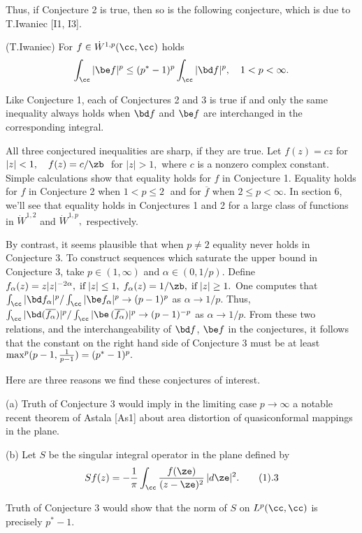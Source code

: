 Thus, if Conjecture 2 is true, then so is the following conjecture, which is 
due to T.Iwaniec [I1, I3]. 

 (T.Iwaniec) For $f\in \dot W^{1,p}(\cc, \cc)$ holds
$$\icc |\be f|^p \leq  (p^* - 1)^p \icc|\bd f|^p, \quad 1<p<\infty.$$ \endproclaim

Like Conjecture 1, each of Conjectures 2 and 3 is true if and only the same 
inequality always holds when $\bd f$ and $\be f$ are interchanged in the 
corresponding integral. 

All three conjectured inequalities are sharp, if they are true. Let $f(z) = 
cz$ for $|z|<1,\quad f(z) = c/\zb\;$ for $|z|>1,$ where $c$ is a nonzero 
complex constant. Simple calculations show that 
equality holds for $f$ in Conjecture 1. Equality holds for $f$ in Conjecture 2 
when $1< p \leq 2\;$ and for $\overline {f}$ when $2\leq p <\infty.$  
In section 6, we'll see that equality holds in 
Conjectures 1 and 2 for a large class of functions in $\dot W^{1,2}$ and 
$\dot W^{1,p},$ respectively. 

By contrast, it seems plausible that when $p\ne 2$ equality never holds in 
Conjecture 3. To construct sequences which saturate the upper bound in 
Conjecture 3, take $p\in (1, \infty)$ and $\alpha \in (0,1/p).$  Define
$f_{\alpha}(z) = z|z|^{-2\alpha},\; \text{if}\;|z|\leq 1,\;
f_{\alpha}(z) = 1/{\zb},\;\text{if}\; |z|\geq 1.$ One computes that $\icc |\bd 
f_{\alpha}|^p / \icc |\be f_{\alpha}|^p  
\rightarrow (p -1)^p$ as $\alpha \rightarrow 1/p.$  Thus, 
$\icc |\bd (\overline{f_{\alpha}})|^p / \icc |\be\,(\overline{f_{\alpha}})|^p 
\rightarrow (p -1)^{-p}$  
as $\alpha \rightarrow 1/p.$ From these two relations, and the 
interchangeability of $\bd f$, $\be f$ in the conjectures, it follows that the 
constant on the right hand side of Conjecture 3 must be at least 
$\max^p (p-1, {1\over {p-1}}) = (p^*-1)^p.$ 

Here are three reasons we find these conjectures of interest.

(a) Truth of Conjecture 3 would imply in the limiting case 
$p\rightarrow\infty$ a notable recent theorem of Astala [As1] about area 
distortion of quasiconformal mappings in the plane.   

(b)  Let $S$ be the singular integral operator in the plane defined by
$$Sf(z) = -{1\over {\pi}} \icc {f(\ze)\over {(z-\ze)^2}}\,|d\ze|^2.\tag1.3$$

Truth of Conjecture 3 would show that the norm of $S$ on $L^p(\cc, \cc)$ is 
precisely $p^* - 1.$ 

